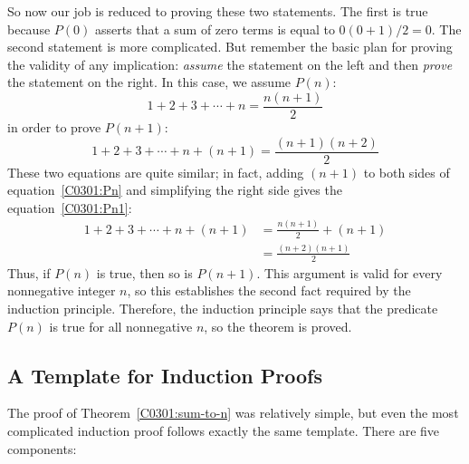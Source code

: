 So now our job is reduced to proving these two statements.  The first
is true because $P(0)$ asserts that a sum of zero terms is equal to
$0(0+1)/2 = 0$.
%
The second statement is more complicated.  But remember the basic plan
for proving the validity of any implication: \textit{assume} the
statement on the left and then \textit{prove} the statement on the
right.  In this case, we assume $P(n)$:
\begin{equation}\label{C0301:Pn}
1 + 2 + 3 + \cdots + n  = \frac{n(n+1)}{2}
\end{equation}
in order to prove $P(n+1)$:
\begin{equation}\label{C0301:Pn1}
1 + 2 + 3 + \cdots + n + (n+1) = \frac{(n+1)(n+2)}{2}
\end{equation}
These two equations are quite similar; in fact, adding $(n+1)$ to both
sides of equation~\eqref{C0301:Pn} and simplifying the right side 
gives the equation~\eqref{C0301:Pn1}:
\begin{align*}
1 + 2 + 3 + \cdots + n + (n+1)
    & = \frac{n(n+1)}{2} + (n+1) \\
    & = \frac{(n+2)(n+1)}{2}
\end{align*}
Thus, if $P(n)$ is true, then so is $P(n+1)$.  This argument is valid
for every nonnegative integer $n$, so this establishes the second fact
required by the induction principle.  Therefore, the induction principle
says that the predicate $P(n)$ is true for all nonnegative $n$, so the 
theorem is proved.

\iffalse
In effect, we've just proved
that $P(0)$ implies $P(1)$, $P(1)$ implies $P(2)$, $P(2)$ implies
$P(3)$, etc., all in one fell swoop.
\fi

\iffalse
\begin{notesproblem}
Prove by induction on $n$ that
\hyperdef{geometric}{sum}{\begin{equation}\label{geometric-n}
1+r+r^2+\cdots+r^n = \frac{r^{n+1}-1}{r-1}
\end{equation}}
for all $n \in \naturals$ and numbers $r\neq 1$.
\end{notesproblem}
\fi

\subsection{A Template for Induction Proofs}
\label{C0301:templ-induct-proofs}

The proof of Theorem~\ref{C0301:sum-to-n} was relatively simple, but even
the most complicated induction proof follows exactly the same
template.  There are five components:

